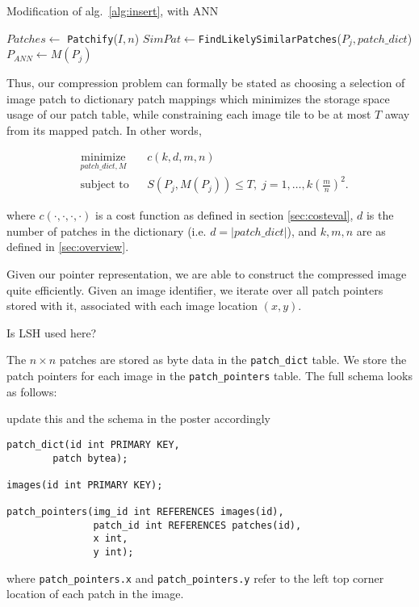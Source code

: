 \begin{algorithm}
    \caption{Modification of alg.~\ref{alg:insert}, with ANN}
    \label{alg:insert2}
\begin{algorithmic}[1]
\State $Patches \leftarrow $ \texttt{Patchify}($I,n$)
\State $SimPat \leftarrow $\texttt{FindLikelySimilarPatches}($P_j,patch\_dict$)
\State $P_{ANN} \leftarrow M(P_j)$
\EndIf
\EndFor
\vspace{3mm}
\end{algorithmic}
\end{algorithm}

Thus, our compression problem can formally be stated as choosing a selection of image patch to dictionary patch mappings which minimizes the storage space usage of our patch table, while constraining each image tile to be at most $T$ away from its mapped patch.  In other words,

\begin{equation*}
\begin{aligned}
& \underset{patch\_dict, M}{\text{minimize}}
& & c(k, d, m, n) \\
& \text{subject to}
& & S(P_j, M(P_j)) \leq T, \; j = 1, \ldots, k\left(\frac{m}{n}\right)^2.
\end{aligned}
\end{equation*}

where $c(\cdot, \cdot, \cdot, \cdot)$ is a cost function as defined in section \ref{sec:costeval}, $d$ is the number of patches in the dictionary (i.e. $d = |patch\_dict|$), and $k,m,n$ are as defined in \ref{sec:overview}.

Given our pointer representation, we are able to construct the compressed image quite efficiently.  Given an image identifier, we iterate over all patch pointers stored with it, associated with each image location $(x,y)$.  
\begin{edit}
Is LSH used here?
\end{edit}


The $n \times n$ patches are stored as byte data in the \texttt{patch\_dict} table.
We store the patch pointers for
each image in the \texttt{patch\_pointers} table. The full schema looks as follows: 
\begin{edit}
update this and the schema in the poster accordingly
\end{edit}
\begin{verbatim}
patch_dict(id int PRIMARY KEY,
        patch bytea);

images(id int PRIMARY KEY);

patch_pointers(img_id int REFERENCES images(id),
               patch_id int REFERENCES patches(id),
               x int,
               y int);
\end{verbatim}
where \texttt{patch\_pointers.x} and \texttt{patch\_pointers.y}
refer to the left top corner location of each patch in the image.

